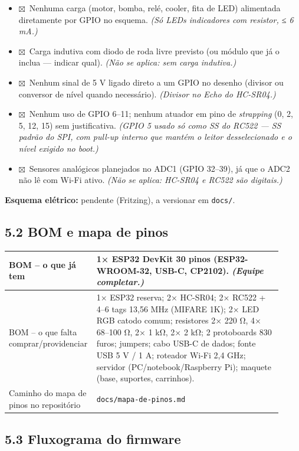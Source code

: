 \documentclass[11pt,a4paper]{article}
\newcommand{\marcado}{$\boxtimes$}
\newcommand{\cod}[1]{\texttt{#1}}
\begin{document}
\begin{itemize}[label={}, leftmargin=1.5em]
\item \marcado\ Nenhuma carga (motor, bomba, relé, cooler, fita de LED) alimentada diretamente por GPIO no esquema. \textit{(Só LEDs indicadores com resistor, ≤ 6 mA.)}
\item \marcado\ Carga indutiva com diodo de roda livre previsto (ou módulo que já o inclua --- indicar qual). \textit{(Não se aplica: sem carga indutiva.)}
\item \marcado\ Nenhum sinal de 5 V ligado direto a um GPIO no desenho (divisor ou conversor de nível quando necessário). \textit{(Divisor no Echo do HC-SR04.)}
\item \marcado\ Nenhum uso de GPIO 6--11; nenhum atuador em pino de \textit{strapping} (0, 2, 5, 12, 15) sem justificativa. \textit{(GPIO 5 usado só como SS do RC522 --- SS padrão do SPI, com pull-up interno que mantém o leitor desselecionado e o nível exigido no boot.)}
\item \marcado\ Sensores analógicos planejados no ADC1 (GPIO 32--39), já que o ADC2 não lê com Wi-Fi ativo. \textit{(Não se aplica: HC-SR04 e RC522 são digitais.)}
\end{itemize}

\textbf{Esquema elétrico:} pendente (Fritzing), a versionar em \cod{docs/}.

\subsection*{5.2 BOM e mapa de pinos}

\begin{longtable}{|p{0.25\linewidth}|p{0.67\linewidth}|}
\hline
BOM -- o que já tem & 1× ESP32 DevKit 30 pinos (ESP32-WROOM-32, USB-C, CP2102). \textit{(Equipe completar.)} \\ \hline
BOM -- o que falta comprar/providenciar & 1× ESP32 reserva; 2× HC-SR04; 2× RC522 + 4--6 tags 13,56 MHz (MIFARE 1K); 2× LED RGB catodo comum; resistores 2× 220 Ω, 4× 68--100 Ω, 2× 1 kΩ, 2× 2 kΩ; 2 protoboards 830 furos; jumpers; cabo USB-C de dados; fonte USB 5 V / 1 A; roteador Wi-Fi 2,4 GHz; servidor (PC/notebook/Raspberry Pi); maquete (base, suportes, carrinhos). \\ \hline
Caminho do mapa de pinos no repositório & \cod{docs/mapa-de-pinos.md} \\ \hline
\end{longtable}

\subsection*{5.3 Fluxograma do firmware}
\end{document}
